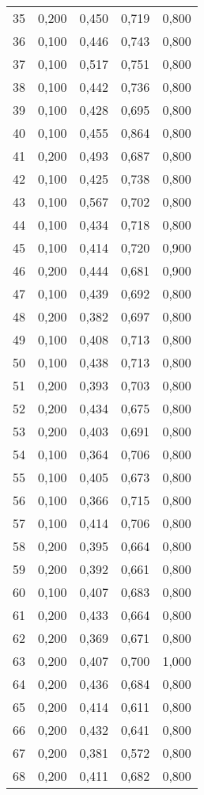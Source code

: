 \begin{longtable}{|l|l|l|l|l|}
        35&0,200&0,450&0,719&0,800\\
        36&0,100&0,446&0,743&0,800\\
        37&0,100&0,517&0,751&0,800\\
        38&0,100&0,442&0,736&0,800\\
        39&0,100&0,428&0,695&0,800\\
        40&0,100&0,455&0,864&0,800\\
        41&0,200&0,493&0,687&0,800\\
        42&0,100&0,425&0,738&0,800\\
        43&0,100&0,567&0,702&0,800\\
        44&0,100&0,434&0,718&0,800\\
        45&0,100&0,414&0,720&0,900\\
        46&0,200&0,444&0,681&0,900\\
        47&0,100&0,439&0,692&0,800\\
        48&0,200&0,382&0,697&0,800\\
        49&0,100&0,408&0,713&0,800\\
        50&0,100&0,438&0,713&0,800\\
        51&0,200&0,393&0,703&0,800\\
        52&0,200&0,434&0,675&0,800\\
        53&0,200&0,403&0,691&0,800\\
        54&0,100&0,364&0,706&0,800\\
        55&0,100&0,405&0,673&0,800\\
        56&0,100&0,366&0,715&0,800\\
        57&0,100&0,414&0,706&0,800\\
        58&0,200&0,395&0,664&0,800\\
        59&0,200&0,392&0,661&0,800\\
        60&0,100&0,407&0,683&0,800\\
        61&0,200&0,433&0,664&0,800\\
        62&0,200&0,369&0,671&0,800\\
        63&0,200&0,407&0,700&1,000\\
        64&0,200&0,436&0,684&0,800\\
        65&0,200&0,414&0,611&0,800\\
        66&0,200&0,432&0,641&0,800\\
        67&0,200&0,381&0,572&0,800\\
        68&0,200&0,411&0,682&0,800\\

\end{longtable}
